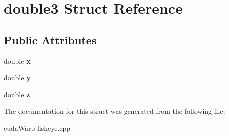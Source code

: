 \hypertarget{structdouble3}{}\section{double3 Struct Reference}
\label{structdouble3}
\subsection*{Public Attributes}
\begin{DoxyCompactItemize}
\item 
double {\bfseries x}\hypertarget{structdouble3_ad0570a8f409c151da3737b52cd1ee0a7}{}\label{structdouble3_ad0570a8f409c151da3737b52cd1ee0a7}

\item 
double {\bfseries y}\hypertarget{structdouble3_ab6fe34e5dcee27325269b48655139159}{}\label{structdouble3_ab6fe34e5dcee27325269b48655139159}

\item 
double {\bfseries z}\hypertarget{structdouble3_a44d35dc88f287935fe8a767e0b4b8d00}{}\label{structdouble3_a44d35dc88f287935fe8a767e0b4b8d00}

\end{DoxyCompactItemize}


The documentation for this struct was generated from the following file\+:\begin{DoxyCompactItemize}
\item 
cuda\+Warp-\/fisheye.\+cpp\end{DoxyCompactItemize}
